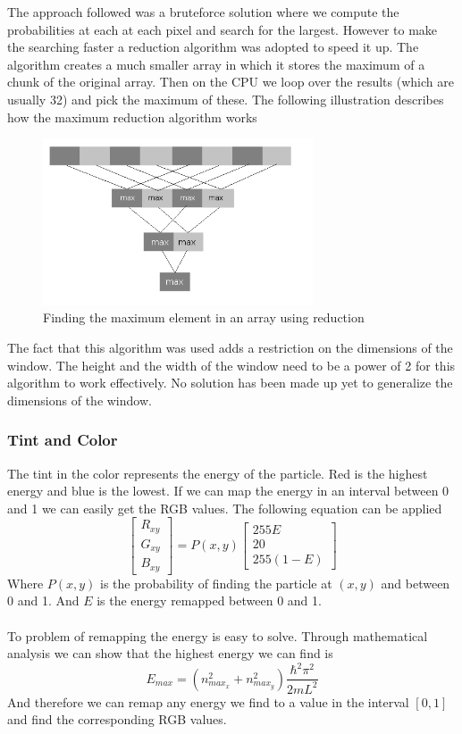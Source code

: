 \documentclass[a4paper, 10pt]{article}
\begin{document}
        The approach followed was a bruteforce solution where we compute the probabilities at each at each
        pixel and search for the largest. However to make the searching faster a reduction algorithm
        was adopted to speed it up. The algorithm creates a much smaller array in which it stores
        the maximum of a chunk of the original array. Then on the CPU we loop over the results (which are
        usually 32) and pick the maximum of these. The following illustration describes how the maximum
        reduction algorithm works
        \begin{figure}[hb]
            \label{fig:reduction}
            \centering
                \includegraphics[width=8cm]{graphics/max_reduction.png}
            \caption{Finding the maximum element in an array using reduction}
        \end{figure}
        The fact that this algorithm was used adds a restriction on the dimensions of the window. The height
        and the width of the window need to be a power of 2 for this algorithm to work effectively.
        No solution has been made up yet to generalize the dimensions of the window.
        
        \subsubsection{Tint and Color}\label{sec:colormap}
        The tint in the color represents the energy of the particle. Red is the highest
        energy and blue is the lowest. If we can map the energy in an interval between
        0 and 1 we can easily get the RGB values. The following equation can be applied
        $$ \begin{bmatrix} R_{xy} \\ G_{xy} \\ B_{xy} \end{bmatrix} = P(x, y)
        \begin{bmatrix} 255E \\ 20 \\ 255(1-E) \end{bmatrix} $$
        Where $P(x, y)$ is the probability of finding the particle at $(x, y)$ and between
        0 and 1. And $E$ is the energy remapped between 0 and 1. \\\\
        To problem of remapping the energy is easy to solve. Through mathematical analysis
        we can show that the highest energy we can find is
        $$ E_{max} = (n^2_{max_x} + n^2_{max_y})\frac{\hbar^2\pi^2}{2mL^2} $$
        And therefore we can remap any energy we find to a value in the interval $[0, 1]$
        and find the corresponding RGB values.
\end{document}
